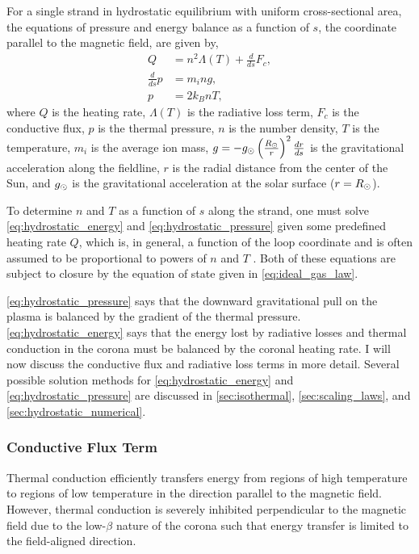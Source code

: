 For a single strand in hydrostatic equilibrium with uniform cross-sectional area, the equations of pressure and energy balance as a function of $s$, the coordinate parallel to the magnetic field, are given by,
\begin{align}
    Q &= n^2\Lambda(T) + \frac{d}{ds}F_c, \label{eq:hydrostatic_energy} \\
    \frac{d}{ds}p &= m_ing, \label{eq:hydrostatic_pressure} \\
    p &= 2k_BnT, \label{eq:ideal_gas_law}
\end{align}
where $Q$ is the heating rate, $\Lambda(T)$ is the radiative loss term, $F_c$ is the conductive flux, $p$ is the thermal pressure, $n$ is the number density, $T$ is the temperature, $m_i$ is the average ion mass, $g=-g_\odot\left(\frac{R_\odot}{r}\right)^2\frac{dr}{ds}$ is the gravitational acceleration along the fieldline, $r$ is the radial distance from the center of the Sun, and $g_\odot$ is the gravitational acceleration at the solar surface ($r=R_\odot$).

To determine $n$ and $T$ as a function of $s$ along the strand, one must solve \autoref{eq:hydrostatic_energy} and \autoref{eq:hydrostatic_pressure} given some predefined heating rate $Q$, which is, in general, a function of the loop coordinate and is often assumed to be proportional to powers of $n$ and $T$ \citep{priest_magnetohydrodynamics_2014}. Both of these equations are subject to closure by the equation of state given in \autoref{eq:ideal_gas_law}.

\autoref{eq:hydrostatic_pressure} says that the downward gravitational pull on the plasma is balanced by the gradient of the thermal pressure. \autoref{eq:hydrostatic_energy} says that the energy lost by radiative losses and thermal conduction in the corona must be balanced by the coronal heating rate. I will now discuss the conductive flux and radiative loss terms in more detail. Several possible solution methods for \autoref{eq:hydrostatic_energy} and \autoref{eq:hydrostatic_pressure} are discussed in \autoref{sec:isothermal}, \ref{sec:scaling_laws}, and \ref{sec:hydrostatic_numerical}.

\subsubsection{Conductive Flux Term}\label{sec:heat-flux}

Thermal conduction efficiently transfers energy from regions of high temperature to regions of low temperature in the direction parallel to the magnetic field. However, thermal conduction is severely inhibited perpendicular to the magnetic field due to the low-$\beta$ nature of the corona such that energy transfer is limited to the field-aligned direction. 

